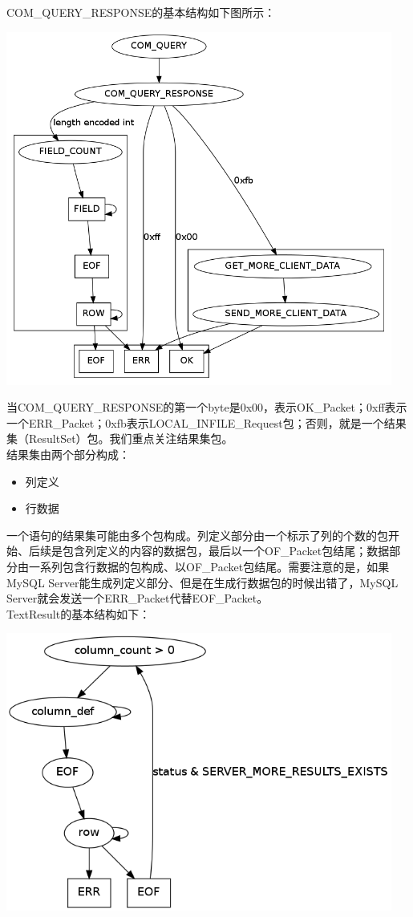 \documentclass[a4paper, titlepage, 10pt, bookmark]{article}
\begin{document}
COM\_QUERY\_RESPONSE的基本结构如下图所示：
\begin{center}
\includegraphics[width=5in]{013.png}
\end{center}

当COM\_QUERY\_RESPONSE的第一个byte是0x00，表示OK\_Packet；0xff表示一个ERR\_Packet；0xfb表示LOCAL\_INFILE\_Request包；否则，就是一个结果集（ResultSet）包。我们重点关注结果集包。\\

结果集由两个部分构成：
\begin{itemize}
    \item 列定义
    \item 行数据
\end{itemize}

一个语句的结果集可能由多个包构成。列定义部分由一个标示了列的个数的包开始、后续是包含列定义的内容的数据包，最后以一个OF\_Packet包结尾；数据部分由一系列包含行数据的包构成、以OF\_Packet包结尾。需要注意的是，如果MySQL Server能生成列定义部分、但是在生成行数据包的时候出错了，MySQL Server就会发送一个ERR\_Packet代替EOF\_Packet。\\

TextResult的基本结构如下：
\begin{center}
\includegraphics[width=5in]{014.png}
\end{center}
\end{document}
